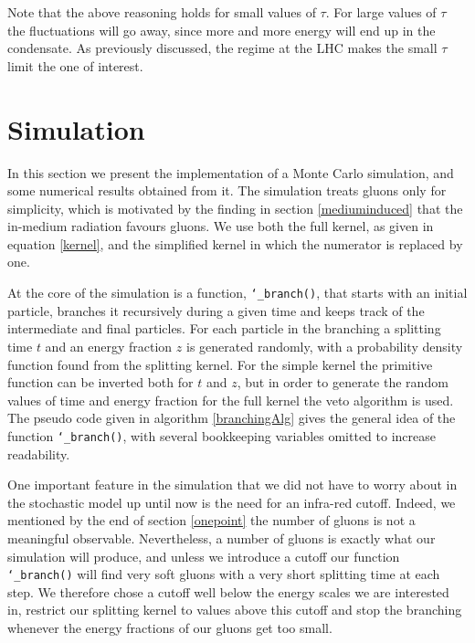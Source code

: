 \documentclass[a4paper,12pt]{article}
\numberwithin{equation}{section}
\begin{document}
Note that the above reasoning holds for small values of $\tau$. For large values of $\tau$ the fluctuations will go away, since more and more energy will end up in the condensate. As previously discussed, the regime at the LHC makes the small $\tau$ limit the one of interest.


\section{Simulation}\label{simulation}
In this section we present the implementation of a Monte Carlo simulation, and some numerical results obtained from it. The simulation treats gluons only for simplicity, which is motivated by the finding in section \ref{mediuminduced} that the in-medium radiation favours gluons. We use both the full kernel, as given in equation \eqref{kernel}, and the simplified kernel in which the numerator is replaced by one. 








At the core of the simulation is a function, {\tt \char`_branch()}, that starts with an initial particle, branches it recursively during a given time and keeps track of the intermediate and final particles. For each particle in the branching a splitting time $t$ and an energy fraction $z$ is generated randomly, with a probability density function found from the splitting kernel. For the simple kernel the primitive function can be inverted both for $t$ and $z$, but in order to generate the random values of time and energy fraction for the full kernel the veto algorithm is used.
The pseudo code given in algorithm \ref{branchingAlg} gives the general idea of the function {\tt \char`_branch()}, with several bookkeeping variables omitted to increase readability.


One important feature in the simulation that we did not have to worry about in the stochastic model up until now is the need for an infra-red cutoff. Indeed, we mentioned by the end of section \ref{onepoint} the number of gluons is not a meaningful observable. Nevertheless, a number of gluons is exactly what our simulation will produce, and unless we introduce a cutoff our function {\tt \char`_branch()} will find very soft gluons with a very short splitting time at each step. We therefore chose a cutoff well below the energy scales we are interested in, restrict our splitting kernel to values above this cutoff and stop the branching whenever the energy fractions of our gluons get too small.
\end{document}
